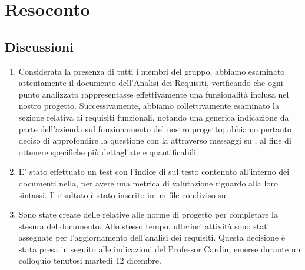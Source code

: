 \section{Resoconto} \label{sec:resoconto}
\subsection{Discussioni} \label{subsec:resdiscussione}
\begin{enumerate}
    \item Considerata la presenza di tutti i membri del gruppo, abbiamo esaminato attentamente il documento dell'Analisi dei Requisiti, verificando che ogni punto analizzato rappresentasse effettivamente una funzionalità inclusa nel nostro progetto. Successivamente, abbiamo collettivamente esaminato la sezione relativa ai requisiti funzionali, notando una generica indicazione da parte dell'azienda sul funzionamento del nostro progetto; abbiamo pertanto deciso di approfondire la questione con la  attraverso messaggi su , al fine di ottenere specifiche più dettagliate e quantificabili.
    
    \item E' stato effettuato un test con l'indice di  sul testo contenuto all'interno dei documenti nella, per avere una metrica di valutazione riguardo alla loro sintassi. Il risultato è stato inserito in un file condiviso su .
    
    \item Sono state create delle  relative alle norme di progetto per completare la stesura del documento. Allo stesso tempo, ulteriori attività sono stati assegnate per l'aggiornamento dell'analisi dei requisiti. Questa decisione è stata presa in seguito alle indicazioni del Professor Cardin, emerse durante un colloquio tenutosi martedì 12 dicembre.
    
\end{enumerate}

